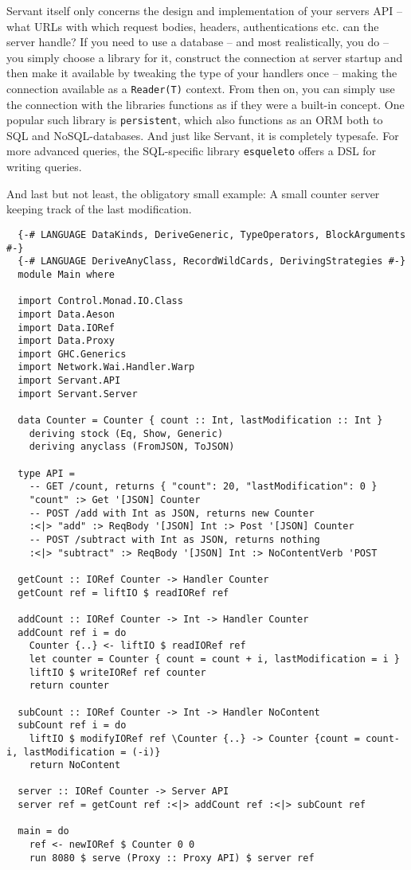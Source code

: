 \documentclass[11pt,utf8,english,a4paper]{article}
\begin{document}
Servant itself only concerns the design and implementation of your servers API -- what URLs with
which request bodies, headers, authentications etc. can the server handle?
If you need to use a database -- and most realistically, you do -- you simply choose a library for
it, construct the connection at server startup and then make it available by tweaking the
type of your handlers once -- making the connection available as a \texttt{Reader(T)} context.
From then on, you can simply use the connection with the libraries functions as if they
were a built-in concept.
One popular such library is \texttt{persistent}, which also functions as an ORM both to SQL and NoSQL-databases.
And just like Servant, it is completely typesafe.
For more advanced queries, the SQL-specific library \texttt{esqueleto} offers a DSL for writing queries.

And last but not least, the obligatory small example: A small counter server keeping track of the last
modification.

\begin{verbatim}
  {-# LANGUAGE DataKinds, DeriveGeneric, TypeOperators, BlockArguments #-}
  {-# LANGUAGE DeriveAnyClass, RecordWildCards, DerivingStrategies #-}
  module Main where
  
  import Control.Monad.IO.Class
  import Data.Aeson
  import Data.IORef
  import Data.Proxy
  import GHC.Generics
  import Network.Wai.Handler.Warp
  import Servant.API
  import Servant.Server
  
  data Counter = Counter { count :: Int, lastModification :: Int }
    deriving stock (Eq, Show, Generic)
    deriving anyclass (FromJSON, ToJSON)
  
  type API =
    -- GET /count, returns { "count": 20, "lastModification": 0 }
    "count" :> Get '[JSON] Counter
    -- POST /add with Int as JSON, returns new Counter
    :<|> "add" :> ReqBody '[JSON] Int :> Post '[JSON] Counter
    -- POST /subtract with Int as JSON, returns nothing
    :<|> "subtract" :> ReqBody '[JSON] Int :> NoContentVerb 'POST
  
  getCount :: IORef Counter -> Handler Counter
  getCount ref = liftIO $ readIORef ref
  
  addCount :: IORef Counter -> Int -> Handler Counter
  addCount ref i = do
    Counter {..} <- liftIO $ readIORef ref
    let counter = Counter { count = count + i, lastModification = i }
    liftIO $ writeIORef ref counter
    return counter
  
  subCount :: IORef Counter -> Int -> Handler NoContent
  subCount ref i = do
    liftIO $ modifyIORef ref \Counter {..} -> Counter {count = count-i, lastModification = (-i)}
    return NoContent
  
  server :: IORef Counter -> Server API
  server ref = getCount ref :<|> addCount ref :<|> subCount ref
  
  main = do
    ref <- newIORef $ Counter 0 0
    run 8080 $ serve (Proxy :: Proxy API) $ server ref
\end{verbatim}
\end{document}
